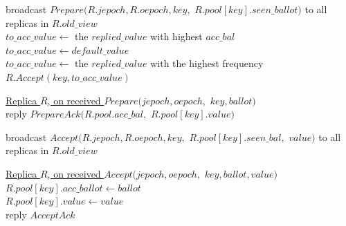 \documentclass[twocolumn]{article}
\begin{document}
\begin{algorithm}
    \caption{$Prepare(key, default\_value)$}
    \label{alg:jetpack_prepare}
    \setcounter{AlgoLine}{80}

    broadcast $Prepare(R.jepoch, R.oepoch, key,$ $R.pool[key].seen\_ballot)$ to all replicas in $R.old\_view$\\

     {
         {
            $to\_acc\_value\gets$ the $replied\_value$ with highest $acc\_bal$\\
        } {
             {
                $to\_acc\_value\gets default\_value$\\
            } {
                $to\_acc\_value\gets$ the $replied\_value$ with the highest frequency\\
            }
        }
        $R.Accept(key, to\_acc\_value)$\\
    }

    \vskip 10pt
    
    \underline{Replica $R$, on received $Prepare(jepoch, oepoch,$}
    \underline{$key, ballot)$}\\
     {
        reply $PrepareAck(R.pool.acc\_bal,$ $R.pool[key].value)$
    }

\end{algorithm}


\begin{algorithm}
    \caption{$Accept(key, value)$}
    \label{alg:jetpack_accept}
    \setcounter{AlgoLine}{89}

    broadcast $Accept(R.jepoch, R.oepoch, key, $ $R.pool[key].seen\_bal,$ $value)$ to all replicas in $R.old\_view$\\

    \vskip 10pt
    
    \underline{Replica $R$, on received $Accept(jepoch, oepoch, $}
    \underline{$key, ballot, value)$}\\
     {
        $R.pool[key].acc\_ballot\gets ballot$\\
        $R.pool[key].value\gets value$\\
        reply $AcceptAck$\\
    }
\end{algorithm}
\end{document}
